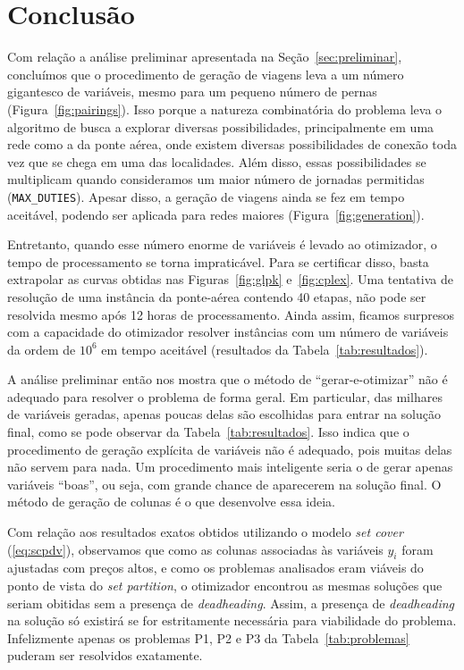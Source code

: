 \zerar
\chapter{Conclusão}
\label{cap:conclusao}

Com relação a análise preliminar apresentada na Seção~\ref{sec:preliminar}, concluímos que o
procedimento de geração de viagens leva a um número gigantesco de variáveis, mesmo para um pequeno
número de pernas (Figura~\ref{fig:pairings}). Isso porque a natureza combinatória do problema leva o
algoritmo de busca a explorar diversas possibilidades, principalmente em uma rede como a da ponte
aérea, onde existem diversas possibilidades de conexão toda vez que se chega em uma das localidades.
Além disso, essas possibilidades se multiplicam quando consideramos um maior número de jornadas
permitidas (\verb|MAX_DUTIES|). Apesar disso, a geração de viagens ainda se fez em tempo aceitável,
podendo ser aplicada para redes maiores (Figura~\ref{fig:generation}).

Entretanto, quando esse número enorme de variáveis é levado ao otimizador, o tempo de processamento
se torna impraticável. Para se certificar disso, basta extrapolar as curvas obtidas nas
Figuras~\ref{fig:glpk} e~\ref{fig:cplex}. Uma tentativa de resolução de uma instância da ponte-aérea
contendo 40 etapas, não pode ser resolvida mesmo após 12 horas de processamento. Ainda assim,
ficamos surpresos com a capacidade do otimizador resolver instâncias com um número de variáveis da
ordem de $10^6$ em tempo aceitável (resultados da Tabela~\ref{tab:resultados}).

A análise preliminar então nos mostra que o método de ``gerar-e-otimizar'' não é adequado para
resolver o problema de forma geral. Em particular, das milhares de variáveis geradas, apenas poucas
delas são escolhidas para entrar na solução final, como se pode observar da
Tabela~\ref{tab:resultados}. Isso indica que o procedimento de geração explícita de variáveis não é
adequado, pois muitas delas não servem para nada. Um procedimento mais inteligente seria o de gerar
apenas variáveis ``boas'', ou seja, com grande chance de aparecerem na solução final. O método de
geração de colunas é o que desenvolve essa ideia.

Com relação aos resultados exatos obtidos utilizando o modelo {\it set cover} (\ref{eq:scpdv}), 
observamos que como as colunas associadas às variáveis $y_i$ foram ajustadas com preços altos, e 
como os problemas analisados eram viáveis do ponto de vista do {\it set partition}, o otimizador 
encontrou as mesmas soluções que seriam obitidas sem a presença de {\it deadheading}. Assim, a 
presença de {\it deadheading} na solução só existirá se for estritamente necessária para 
viabilidade do problema. Infelizmente apenas os problemas P1, P2 e P3 da Tabela~\ref{tab:problemas}
puderam ser resolvidos exatamente.

